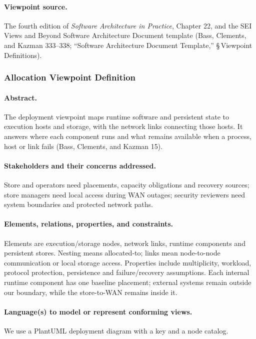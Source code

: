 \paragraph{Viewpoint source.}
The fourth edition of \emph{Software Architecture in Practice}, Chapter 22, and the SEI
Views and Beyond Software Architecture Document template (Bass, Clements, and Kazman
333--338; ``Software Architecture Document Template,'' \S\,Viewpoint Definitions).

\subsubsection{Allocation Viewpoint Definition}
\paragraph{Abstract.}
The deployment viewpoint maps runtime software and persistent state to execution
hosts and storage, with the network links connecting those hosts. It answers
where each component runs and what remains available when a process, host or
link fails (Bass, Clements, and Kazman 15).

\paragraph{Stakeholders and their concerns addressed.}
Store and \DC operators need placements, capacity obligations and recovery
sources; store managers need local access during WAN outages; security reviewers
need system boundaries and protected network paths.

\paragraph{Elements, relations, properties, and constraints.}
Elements are execution/storage nodes, network links, runtime components and
persistent stores. Nesting means allocated-to; links mean node-to-node
communication or local storage access. Properties include multiplicity, workload,
protocol protection, persistence and failure/recovery assumptions. Each internal
runtime component has one baseline placement; external systems remain outside
our boundary, while the store-to-\DC WAN remains inside it.

\paragraph{Language(s) to model or represent conforming views.}
We use a PlantUML deployment diagram with a key and a node catalog.

